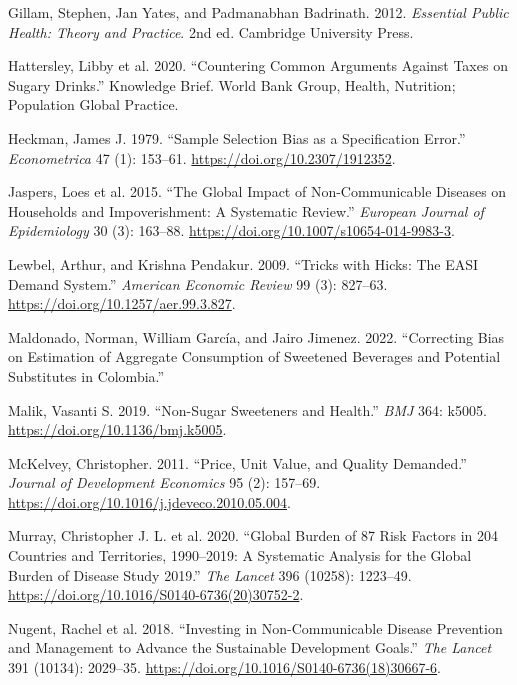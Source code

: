 \documentclass[
  11pt,
]{article}
\newlength{\cslhangindent}
\newenvironment{CSLReferences}[2] %
 {\begin{list}{}{%
  \setlength{\itemindent}{0pt}
  \setlength{\leftmargin}{0pt}
  \setlength{\parsep}{0pt}
  \ifodd #1
   \setlength{\leftmargin}{\cslhangindent}
   \setlength{\itemindent}{-1\cslhangindent}
  \fi
  \setlength{\itemsep}{#2\baselineskip}}}
 {\end{list}}
\begin{document}
\begin{CSLReferences}{1}{0}
Gillam, Stephen, Jan Yates, and Padmanabhan Badrinath. 2012.
\emph{Essential Public Health: Theory and Practice}. 2nd ed. Cambridge
University Press.

Hattersley, Libby et al. 2020. {``Countering Common Arguments Against
Taxes on Sugary Drinks.''} Knowledge Brief. World Bank Group, Health,
Nutrition; Population Global Practice.

Heckman, James J. 1979. {``Sample Selection Bias as a Specification
Error.''} \emph{Econometrica} 47 (1): 153--61.
\url{https://doi.org/10.2307/1912352}.

Jaspers, Loes et al. 2015. {``The Global Impact of Non-Communicable
Diseases on Households and Impoverishment: A Systematic Review.''}
\emph{European Journal of Epidemiology} 30 (3): 163--88.
\url{https://doi.org/10.1007/s10654-014-9983-3}.

Lewbel, Arthur, and Krishna Pendakur. 2009. {``Tricks with {Hicks}: The
{EASI} Demand System.''} \emph{American Economic Review} 99 (3):
827--63. \url{https://doi.org/10.1257/aer.99.3.827}.

Maldonado, Norman, William García, and Jairo Jimenez. 2022.
{``Correcting Bias on Estimation of Aggregate Consumption of Sweetened
Beverages and Potential Substitutes in {Colombia}.''}

Malik, Vasanti S. 2019. {``Non-Sugar Sweeteners and Health.''}
\emph{BMJ} 364: k5005. \url{https://doi.org/10.1136/bmj.k5005}.

McKelvey, Christopher. 2011. {``Price, Unit Value, and Quality
Demanded.''} \emph{Journal of Development Economics} 95 (2): 157--69.
\url{https://doi.org/10.1016/j.jdeveco.2010.05.004}.

Murray, Christopher J. L. et al. 2020. {``Global Burden of 87 Risk
Factors in 204 Countries and Territories, 1990--2019: A Systematic
Analysis for the {Global Burden of Disease Study 2019}.''} \emph{The
Lancet} 396 (10258): 1223--49.
\url{https://doi.org/10.1016/S0140-6736(20)30752-2}.

Nugent, Rachel et al. 2018. {``Investing in Non-Communicable Disease
Prevention and Management to Advance the {Sustainable Development
Goals}.''} \emph{The Lancet} 391 (10134): 2029--35.
\url{https://doi.org/10.1016/S0140-6736(18)30667-6}.


\end{CSLReferences}
\end{document}
